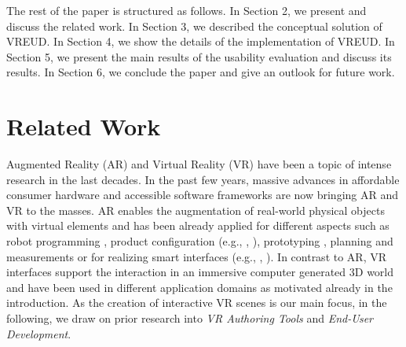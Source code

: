 \documentclass[conference]{IEEEtran}
\begin{document}
The rest of the paper is structured as follows. In Section 2, we present and discuss the related work. In Section 3, we described the conceptual solution of VREUD. In Section 4, we show the details of the implementation of VREUD. In Section 5, we present the main results of the usability evaluation and discuss its results. In Section 6, we conclude the paper and give an outlook for future work.  


\section{Related Work}

Augmented Reality (AR) and Virtual Reality (VR) have been a topic of intense research in the last decades. In the past few years, massive advances in affordable consumer hardware and accessible software frameworks are now bringing AR and VR to the masses.  AR enables the augmentation of real-world physical objects with virtual elements and has been already applied for different aspects such as robot programming \cite{DBLP:journals/corr/abs-2106-07944}, product configuration (e.g., \cite{DBLP:conf/hcse/GottschalkYSE20}, \cite{DBLP:conf/hcse/GottschalkYSE20a}), prototyping \cite{DBLP:conf/hcse/JovanovikjY0E20}, planning and measurements \cite{DBLP:conf/eics/EnesScaffolding} or for realizing smart interfaces (e.g., \cite{DBLP:conf/eics/KringsYJ0E20}, \cite{DBLP:conf/interact/YigitbasJ0E19}). In contrast to AR, VR interfaces support the interaction in an immersive computer generated 3D world and have been used in different application domains as motivated already in the introduction. As the creation of interactive VR scenes is our main focus, in the following, we draw on prior research into \textit{\ac{VR} Authoring Tools} and \textit{End-User Development}.
\end{document}
